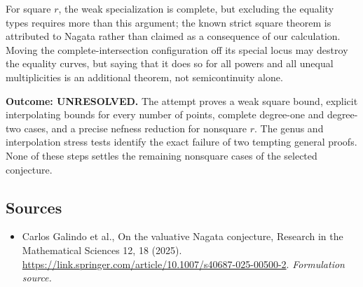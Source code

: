 \documentclass[11pt]{article}
\begin{document}
For square $r$, the weak specialization is complete, but excluding the equality types requires more than this argument; the known strict square theorem is attributed to Nagata rather than claimed as a consequence of our calculation. Moving the complete-intersection configuration off its special locus may destroy the equality curves, but saying that it does so for all powers and all unequal multiplicities is an additional theorem, not semicontinuity alone.

\textbf{Outcome: UNRESOLVED.} The attempt proves a weak square bound, explicit interpolating bounds for every number of points, complete degree-one and degree-two cases, and a precise nefness reduction for nonsquare $r$. The genus and interpolation stress tests identify the exact failure of two tempting general proofs. None of these steps settles the remaining nonsquare cases of the selected conjecture.

\subsection{Sources}
\begin{itemize}
\item[S1]Carlos Galindo et al., On the valuative Nagata conjecture, Research in the Mathematical Sciences 12, 18 (2025).
\url{https://link.springer.com/article/10.1007/s40687-025-00500-2}.
\textit{Formulation source.}
\end{itemize}
\end{document}
